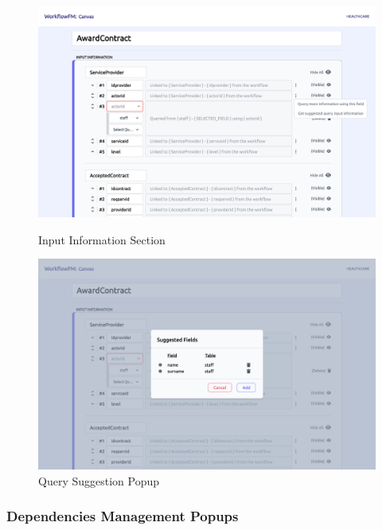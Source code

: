 \begin{figure}[ht!]
\centering
\begin{minipage}{.5\textwidth}
  \centering
  \includegraphics[width=0.9\linewidth]{overleaf/images/screens/input_information_section.png}
  \caption{Input Information Section}
  \label{fig:input_information_section}
\end{minipage}%
\begin{minipage}{.5\textwidth}
  \centering
  \includegraphics[width=0.9\linewidth]{overleaf/images/screens/query_suggestion.png}
  \caption{Query Suggestion Popup}
  \label{fig:query_suggestion}
\end{minipage}
\end{figure}




\subsubsection{Dependencies Management Popups}
\label{im:depend_manage_pop}

